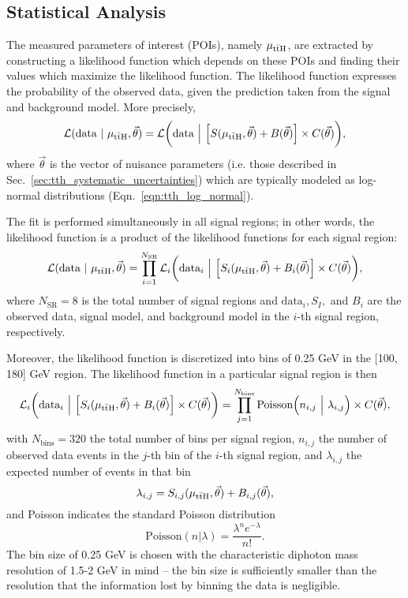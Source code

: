 \subsection{Statistical Analysis} \label{sec:tth_stat_analysis}
The measured parameters of interest (POIs), namely $\mu_{\mathrm{t\bar{t}H}}$, are extracted by constructing a likelihood function which depends on these POIs and finding their values which maximize the likelihood function.
The likelihood function expresses the probability of the observed data, given the prediction taken from the signal and background model.
More precisely,
\begin{equation}
    \mathcal L (\text{data} ~|~ \mu_{\mathrm{t\bar{t}H}}, \vec{\theta}) = \mathcal L \bigg(\text{data} ~\Big|~ \Big[ S(\mu_{\mathrm{t\bar{t}H}}, \vec{\theta}) + B(\vec{\theta}) \Big] \times C(\vec{\theta}) \bigg),
\end{equation} 
where $\vec{\theta}$ is the vector of nuisance parameters (i.e. those described in Sec.~\ref{sec:tth_systematic_uncertainties}) which are typically modeled as log-normal distributions (Eqn.~\ref{eqn:tth_log_normal}).

The fit is performed simultaneously in all signal regions; in other words, the likelihood function is a product of the likelihood functions for each signal region:
\begin{equation}
    \mathcal L (\text{data} ~|~ \mu_{\mathrm{t\bar{t}H}}, \vec{\theta})
    =
    \prod_{i=1}^{N_{\text{SR}}} \mathcal L_i \bigg(\text{data}_i ~\Big|~ \Big[ S_i(\mu_{\mathrm{t\bar{t}H}}, \vec{\theta}) + B_i(\vec{\theta}) \Big] \times C(\vec{\theta}) \bigg),
\end{equation}
where $N_{\text{SR}} = 8$ is the total number of signal regions and $\text{data}_i, S_I,$ and $B_i$ are the observed data, signal model, and background model in the $i$-th signal region, respectively.

Moreover, the likelihood function is discretized into bins of 0.25 GeV in the [100, 180] GeV region. The likelihood function in a particular signal region is then
\begin{equation}
    \mathcal L_i \bigg(\text{data}_i ~\Big|~ \Big[ S_i(\mu_{\mathrm{t\bar{t}H}}, \vec{\theta}) + B_i(\vec{\theta}) \Big] \times C(\vec{\theta}) \bigg)
    = 
    \prod_{j=1}^{N_\text{bins}} \text{Poisson}\Big( n_{i,j} ~\Big|~ \lambda_{i,j} \Big) \times C(\vec{\theta}),
\end{equation}
with $N_\text{bins} = 320$ the total number of bins per signal region, $n_{i,j}$ the number of observed data events in the $j$-th bin of the $i$-th signal region, and $\lambda_{i,j}$ the expected number of events in that bin
\begin{equation}
    \lambda_{i,j} = S_{i,j}(\mu_{\mathrm{t\bar{t}H}}, \vec{\theta}) + B_{i,j}(\vec{\theta}),
\end{equation}
and Poisson indicates the standard Poisson distribution
\begin{equation}
    \text{Poisson}(n|\lambda)
    =
    \frac{\lambda^n e^{-\lambda}}{n!}.
\end{equation}
The bin size of 0.25 GeV is chosen with the characteristic diphoton mass resolution of 1.5-2 GeV in mind -- the bin size is sufficiently smaller than the resolution that the information lost by binning the data is negligible.


